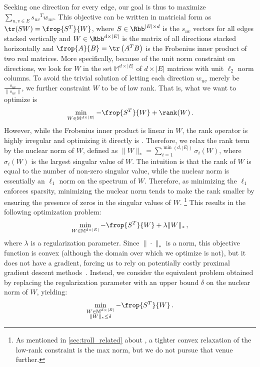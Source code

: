 Seeking one direction for every edge, our goal is thus to maximize
$\sum_{u,v\in E} {s_{uv}}^T w_{uv}$. This objective can be written in matricial form as $\tr(SW) =
\frop{S^T}{W}$, where $S \in \Rbb^{|E| \times d}$ is the $s_{uv}$ vectors for all edges stacked
vertically and $W \in \Rbb^{d \times |E|}$ is the matrix of all directions stacked horizontally
and $\frop{A}{B} = \tr\left(A^T B\right)$ is the Frobenius inner product of two real matrices.
More specifically, because of the unit norm constraint on directions, we look for $W$ in the set
$\mathbb{M}^{d\times |E|}$ of $d\times |E|$ matrices with unit $\ell_2$ norm columns. To avoid the
trivial solution of letting each direction $w_{uv}$ merely be $\frac{s_{uv}}{\|s_{uv}\|}$, we
further constraint $W$ to be of low rank. That is, what we want to optimize is \[\min_{W\in
\mathbb{M}^{d\times |E|}} -\frop{S^T}{W} + \rank(W)\,.\] However, while the Frobenius inner product is
linear in $W$, the rank operator is highly irregular and optimizing it directly is \NPc{}.  Therefore,
we relax the rank term by the nuclear norm of $W$, defined as $\|W\|_* = \sum_{i=1}^{\min(d,|E|)}
\sigma_i(W)$, where $\sigma_i(W)$ is the \ith{} largest singular value of $W$. The intuition is
that the rank of $W$ is
equal to the number of non-zero singular value, while the nuclear norm is essentially an $\ell_1$ norm on
the spectrum of $W$. Therefore, as minimizing the $\ell_1$ enforces sparsity, minimizing the nuclear
norm tends to make the rank smaller by ensuring the presence of zeros in the singular values of $W$.
\footnote{As mentioned in \autoref{sec:troll_related} about \autocite{OnlineCompletion17}, a tighter
convex relaxation of the low-rank constraint is the max norm, but we do not pursue that venue
further.} This
results in the following optimization problem: \[\min_{W\in \mathbb{M}^{d\times |E|}} -\frop{S^T}{W}
+ \lambda \|W\|_*\,,\] where $\lambda$ is a regularization parameter. Since $\|\cdot\|_*$ is a norm, this
objective function is convex (although the domain over which we optimize is not), but it does not
have a gradient, forcing us to rely on potentially costly proximal gradient descent
methods~\autocite{Parikh2013a}. Instead, we consider the equivalent problem obtained by replacing
the regularization parameter with an upper bound $\delta$ on the nuclear norm of $W$, yielding:
\begin{equation*}
  \min_{\substack{W\in \mathbb{M}^{d\times |E|} \\ \|W\|_* \leq \delta}} -\frop{S^T}{W}\,.
\end{equation*}

